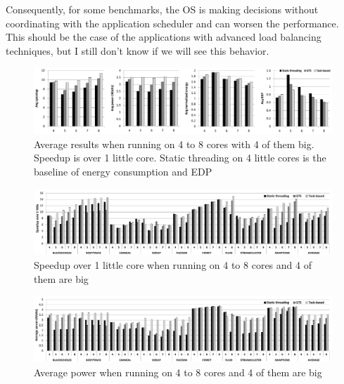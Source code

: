 Consequently, for some benchmarks, the OS is making decisions without coordinating with the application scheduler and can worsen the performance. This should be the case of the applications with advanced load balancing techniques, but I still don't know if we will see this behavior.
\fi
\begin{figure}[t]%
	\centering
	\includegraphics[width=\textwidth]{figures/averages_4plus.pdf}
	\caption{Average results when running on 4 to  8 cores with 4 of them big. Speedup is over 1 little core. Static threading on 4 little cores is the baseline of energy consumption and EDP}
	\label{fig:averages4plus}%
\end{figure}
\begin{figure}[t]%
	\centering
	\includegraphics[width=1.0\textwidth]{figures/speedup-4plus.pdf}
	\caption{Speedup over 1 little core when running on 4 to 8 cores and 4 of them are big}
	\label{fig:speedup4plus}%
\end{figure}

\begin{figure}[t]%
	\centering
	\includegraphics[width=1.0\textwidth]{figures/power4plus.pdf}
	\caption{Average power when running on 4 to 8 cores and 4 of them are big}
	\label{fig:power4plus}%
\end{figure}

